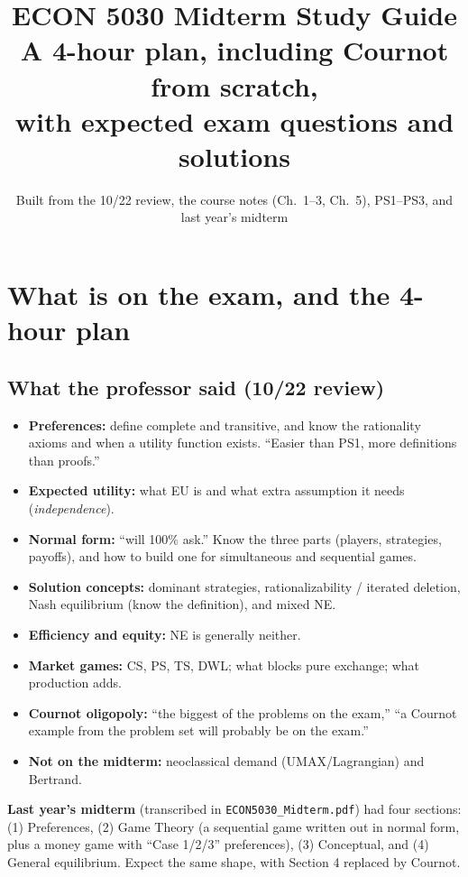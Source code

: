 \documentclass[11pt]{article}
\title{ECON 5030 Midterm Study Guide\\[3pt]\large A 4-hour plan, including Cournot from scratch,\\ with expected exam questions and solutions}
\author{Built from the 10/22 review, the course notes (Ch.\ 1--3, Ch.\ 5), PS1--PS3, and last year's midterm}
\date{}
\begin{document}
\maketitle
\tableofcontents
\newpage

\section{What is on the exam, and the 4-hour plan}

\subsection*{What the professor said (10/22 review)}
\begin{itemize}
\item \textbf{Preferences:} define complete and transitive, and know the rationality axioms and when a utility function exists. ``Easier than PS1, more definitions than proofs.''
\item \textbf{Expected utility:} what EU is and what extra assumption it needs (\emph{independence}).
\item \textbf{Normal form:} ``will 100\% ask.'' Know the three parts (players, strategies, payoffs), and how to build one for simultaneous and sequential games.
\item \textbf{Solution concepts:} dominant strategies, rationalizability / iterated deletion, Nash equilibrium (know the definition), and mixed NE.
\item \textbf{Efficiency and equity:} NE is generally neither.
\item \textbf{Market games:} CS, PS, TS, DWL; what blocks pure exchange; what production adds.
\item \textbf{Cournot oligopoly:} ``the biggest of the problems on the exam,'' ``a Cournot example from the problem set will probably be on the exam.''
\item \textbf{Not on the midterm:} neoclassical demand (UMAX/Lagrangian) and Bertrand.
\end{itemize}

\textbf{Last year's midterm} (transcribed in \texttt{ECON5030\_Midterm.pdf}) had four sections: (1) Preferences, (2) Game Theory (a sequential game written out in normal form, plus a money game with ``Case 1/2/3'' preferences), (3) Conceptual, and (4) General equilibrium. Expect the same shape, with Section 4 replaced by Cournot.
\end{document}
